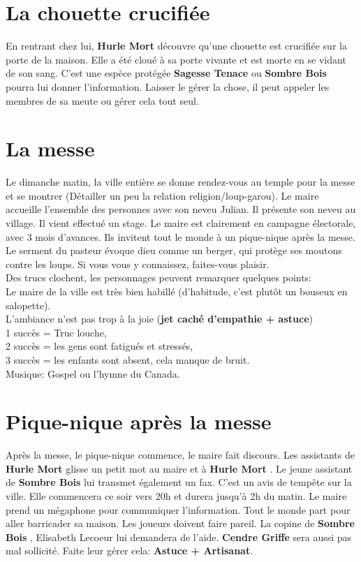 \documentclass[oneside,12pt]{book}
\newcommand{\Jessica}{\textbf{Sagesse Tenace} }
\newcommand{\Luke}{\textbf{Cendre Griffe} }
\newcommand{\Peter}{\textbf{Hurle Mort} }
\newcommand{\Leonard}{\textbf{Sombre Bois} }
\begin{document}
\begin{flushleft}
\section{La chouette crucifiée}
\label{chouette}
En rentrant chez lui, \Peter découvre qu'une chouette est crucifiée sur la porte de la maison. Elle a été cloué à sa porte vivante et est morte en se vidant de son sang. C'est une espèce protégée \Jessica ou \Leonard pourra lui donner l'information. Laisser le gérer la chose, il peut appeler les membres de sa meute ou gérer cela tout seul.

\section{La messe}
Le dimanche matin, la ville entière se donne rendez-vous au temple pour la messe et se montrer (Détailler un peu la relation religion/loup-garou). 
Le maire accueille l'ensemble des personnes avec son neveu Julian. Il présente son neveu au village. Il vient effectué un stage. Le maire est clairement en campagne électorale, avec 3 mois d'avances. Ils invitent tout le monde à un pique-nique après la messe.
Le serment du pasteur évoque dieu comme un berger, qui protège ses moutons contre les loups. Si vous vous y connaissez, faites-vous plaisir. \\ 
Des trucs clochent, les personnages peuvent remarquer quelques points: \\
Le maire de la ville est très bien habillé (d'habitude, c'est plutôt un bouseux en salopette).\\ 
L'ambiance n'est pas trop à la joie (\textbf{jet caché d'empathie + astuce})\\  1 succès = Truc louche,\\  2 succès = les gens sont fatigués et stressés,\\  3 succès = les enfants sont absent, cela manque de bruit.\\
Musique: Gospel ou l'hymne du Canada.

\section{Pique-nique après la messe}
Après la messe, le pique-nique commence, le maire fait discours. Les assistants de \Peter glisse un petit mot au maire et à \Peter. Le jeune assistant de \Leonard lui transmet également un fax. C'est un avis de tempête sur la ville. Elle commencera ce soir vers 20h et durera jusqu’à 2h du matin. Le maire prend un mégaphone pour communiquer l'information. Tout le monde part pour aller barricader sa maison. 
Les joueurs doivent faire pareil. La copine de \Leonard, Elisabeth Lecoeur lui demandera de l'aide. \Luke sera aussi pas mal sollicité. Faite leur gérer cela: \textbf{Astuce + Artisanat}.  \\


\end{flushleft}
\end{document}
